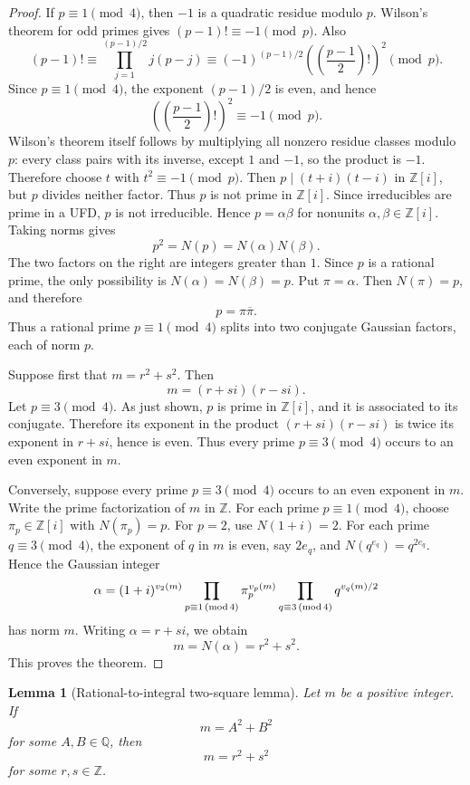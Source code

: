 \documentclass{article}
\theoremstyle{plain}
\theoremstyle{remark}
\theoremstyle{myconjecture}
\theoremstyle{plain}
\newtheorem{lemma}[theorem]{Lemma}
\theoremstyle{definition}
\numberwithin{equation}{section} %
\begin{document}
\begin{proof}
If \(p\equiv1\pmod4\), then \(-1\) is a quadratic residue modulo \(p\).  Wilson's
theorem for odd primes gives \((p-1)!\equiv-1\pmod p\).  Also
\[
        (p-1)!\equiv
        \prod_{j=1}^{(p-1)/2} j(p-j)
        \equiv (-1)^{(p-1)/2}\left(\left(\frac{p-1}{2}\right)!\right)^2
        \pmod p.
\]
Since \(p\equiv1\pmod4\), the exponent \((p-1)/2\) is even, and hence
\[
        \left(\left(\frac{p-1}{2}\right)!\right)^2\equiv -1\pmod p.
\]
Wilson's theorem itself follows by multiplying all nonzero residue classes
modulo \(p\): every class pairs with its inverse, except \(1\) and \(-1\), so
the product is \(-1\).  Therefore choose \(t\) with \(t^2\equiv-1\pmod p\).
Then \(p\mid(t+i)(t-i)\) in \(\mathbb Z[i]\), but \(p\) divides neither factor.
Thus \(p\) is not prime in \(\mathbb Z[i]\).  Since irreducibles are prime in a
UFD, \(p\) is not irreducible.  Hence \(p=\alpha\beta\) for nonunits
\(\alpha,\beta\in\mathbb Z[i]\).  Taking norms gives
\[
        p^2=N(p)=N(\alpha)N(\beta).
\]
The two factors on the right are integers greater than \(1\).  Since \(p\) is a
rational prime, the only possibility is \(N(\alpha)=N(\beta)=p\).  Put
\(\pi=\alpha\).  Then \(N(\pi)=p\), and therefore
\[
        p=\pi\overline\pi.
\]
Thus a rational prime \(p\equiv1\pmod4\) splits into two conjugate Gaussian
factors, each of norm \(p\).

Suppose first that \(m=r^2+s^2\).  Then
\[
        m=(r+si)(r-si).
\]
Let \(p\equiv3\pmod4\).  As just shown, \(p\) is prime in \(\mathbb Z[i]\), and
it is associated to its conjugate.  Therefore its exponent in the product
\((r+si)(r-si)\) is twice its exponent in \(r+si\), hence is even.  Thus every
prime \(p\equiv3\pmod4\) occurs to an even exponent in \(m\).

Conversely, suppose every prime \(p\equiv3\pmod4\) occurs to an even exponent in
\(m\).  Write the prime factorization of \(m\) in \(\mathbb Z\).  For each prime
\(p\equiv1\pmod4\), choose \(\pi_p\in\mathbb Z[i]\) with \(N(\pi_p)=p\).  For
\(p=2\), use \(N(1+i)=2\).  For each prime \(q\equiv3\pmod4\), the exponent of
\(q\) in \(m\) is even, say \(2e_q\), and \(N(q^{e_q})=q^{2e_q}\).  Hence the
Gaussian integer
\[
        \alpha=(1+i)^{v_2(m)}
        \prod_{p\equiv1\,({\rm mod}\,4)}\pi_p^{v_p(m)}
        \prod_{q\equiv3\,({\rm mod}\,4)}q^{v_q(m)/2}
\]
has norm \(m\).  Writing \(\alpha=r+si\), we obtain
\[
        m=N(\alpha)=r^2+s^2.
\]
This proves the theorem.
\end{proof}

\begin{lemma}[Rational-to-integral two-square lemma]\label{lem:rational-integral}
Let \(m\) be a positive integer.  If
\[
        m=A^2+B^2
\]
for some \(A,B\in\mathbb Q\), then
\[
        m=r^2+s^2
\]
for some \(r,s\in\mathbb Z\).
\end{lemma}
\end{document}
